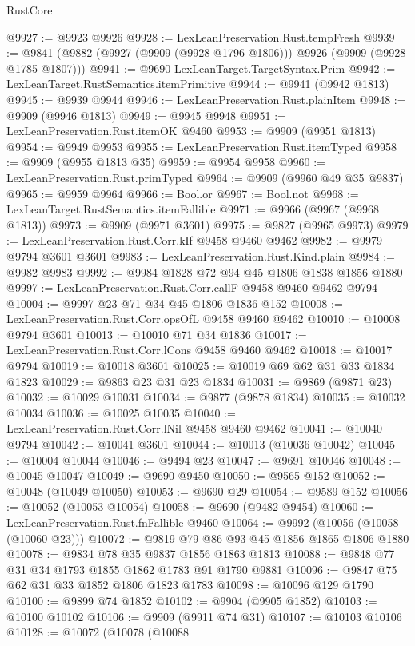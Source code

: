 \begin{lexlean}{RustCore}
\begin{coremodule}
@9927 := @9923 @9926
@9928 := LexLeanPreservation.Rust.tempFresh
@9939 := @9841 (@9882 (@9927 (@9909 (@9928 @1796 @1806))) @9926 (@9909 (@9928 @1785 @1807)))
@9941 := @9690 LexLeanTarget.TargetSyntax.Prim
@9942 := LexLeanTarget.RustSemantics.itemPrimitive
@9944 := @9941 (@9942 @1813)
@9945 := @9939 @9944
@9946 := LexLeanPreservation.Rust.plainItem
@9948 := @9909 (@9946 @1813)
@9949 := @9945 @9948
@9951 := LexLeanPreservation.Rust.itemOK @9460
@9953 := @9909 (@9951 @1813)
@9954 := @9949 @9953
@9955 := LexLeanPreservation.Rust.itemTyped
@9958 := @9909 (@9955 @1813 @35)
@9959 := @9954 @9958
@9960 := LexLeanPreservation.Rust.primTyped
@9964 := @9909 (@9960 @49 @35 @9837)
@9965 := @9959 @9964
@9966 := Bool.or
@9967 := Bool.not
@9968 := LexLeanTarget.RustSemantics.itemFallible
@9971 := @9966 (@9967 (@9968 @1813))
@9973 := @9909 (@9971 @3601)
@9975 := @9827 (@9965 @9973)
@9979 := LexLeanPreservation.Rust.Corr.kIf @9458 @9460 @9462
@9982 := @9979 @9794 @3601 @3601
@9983 := LexLeanPreservation.Rust.Kind.plain
@9984 := @9982 @9983
@9992 := @9984 @1828 @72 @94 @45 @1806 @1838 @1856 @1880
@9997 := LexLeanPreservation.Rust.Corr.callF @9458 @9460 @9462 @9794
@10004 := @9997 @23 @71 @34 @45 @1806 @1836 @152
@10008 := LexLeanPreservation.Rust.Corr.opsOfL @9458 @9460 @9462
@10010 := @10008 @9794 @3601
@10013 := @10010 @71 @34 @1836
@10017 := LexLeanPreservation.Rust.Corr.lCons @9458 @9460 @9462
@10018 := @10017 @9794
@10019 := @10018 @3601
@10025 := @10019 @69 @62 @31 @33 @1834 @1823
@10029 := @9863 @23 @31 @23 @1834
@10031 := @9869 (@9871 @23)
@10032 := @10029 @10031
@10034 := @9877 (@9878 @1834)
@10035 := @10032 @10034
@10036 := @10025 @10035
@10040 := LexLeanPreservation.Rust.Corr.lNil @9458 @9460 @9462
@10041 := @10040 @9794
@10042 := @10041 @3601
@10044 := @10013 (@10036 @10042)
@10045 := @10004 @10044
@10046 := @9494 @23
@10047 := @9691 @10046
@10048 := @10045 @10047
@10049 := @9690 @9450
@10050 := @9565 @152
@10052 := @10048 (@10049 @10050)
@10053 := @9690 @29
@10054 := @9589 @152
@10056 := @10052 (@10053 @10054)
@10058 := @9690 (@9482 @9454)
@10060 := LexLeanPreservation.Rust.fnFallible @9460
@10064 := @9992 (@10056 (@10058 (@10060 @23)))
@10072 := @9819 @79 @86 @93 @45 @1856 @1865 @1806 @1880
@10078 := @9834 @78 @35 @9837 @1856 @1863 @1813
@10088 := @9848 @77 @31 @34 @1793 @1855 @1862 @1783 @91 @1790 @9881
@10096 := @9847 @75 @62 @31 @33 @1852 @1806 @1823 @1783
@10098 := @10096 @129 @1790
@10100 := @9899 @74 @1852
@10102 := @9904 (@9905 @1852)
@10103 := @10100 @10102
@10106 := @9909 (@9911 @74 @31)
@10107 := @10103 @10106
@10128 := @10072
    (@10078
      (@10088

\end{coremodule}
\end{lexlean}
